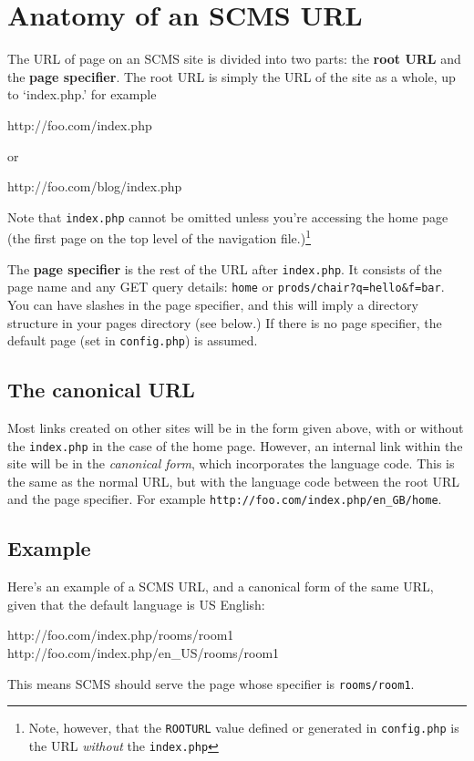 \section{Anatomy of an SCMS URL}

The URL of page on an SCMS site is divided into two parts: the \textbf{root URL}
and the \textbf{page specifier}. The root URL is simply the URL of the site
as a whole, up to `index.php.' for example
\begin{MyVerbatim}
http://foo.com/index.php
\end{MyVerbatim}
or
\begin{MyVerbatim}
http://foo.com/blog/index.php
\end{MyVerbatim}
Note that \texttt{index.php} cannot be omitted unless you're accessing the home page (the first page on the top
level of the navigation file.)\footnote{Note, however, that the \texttt{ROOTURL} value defined or generated in \texttt{config.php}
is the URL \emph{without} the \texttt{index.php}}

The \textbf{page specifier} is the rest of the URL after \texttt{index.php}. It consists of the page name
and any GET query details: \texttt{home} or \texttt{prods/chair?q=hello\&f=bar}.
You can have slashes in the page specifier, and this will imply a directory structure in your
pages directory (see below.) If there is no page specifier, the default page (set in \texttt{config.php}) is assumed.

\subsection{The canonical URL}
Most links created on other sites will be in the form given above, with or without the
\texttt{index.php} in the case of the home page.
However, an internal link within the site will be in the \emph{canonical form}, which incorporates
the language code. This is the same as the normal URL, but with the language code between the root
URL and the page specifier. For example \texttt{http://foo.com/index.php/en\_GB/home}. 
\subsection{Example}
Here's an example of a SCMS URL, and a canonical form of the same URL, given that the default language is US
English:
\begin{MyVerbatim}
	http://foo.com/index.php/rooms/room1
	http://foo.com/index.php/en_US/rooms/room1
\end{MyVerbatim}
This means SCMS should serve the page whose specifier is \texttt{rooms/room1}.

